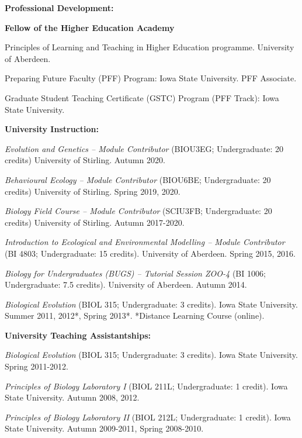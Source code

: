 \documentclass[letterpaper]{article}
\renewenvironment{itemize}{
  \begin{list}{}{
    \setlength{\leftmargin}{1.5em}
  }
}{
  \end{list}
}
\begin{document}
\begin{itemize}
\item {\bf Professional Development:}
\begin{itemize}
\item[$\bullet$]{{\bf Fellow of the Higher Education Academy}}
\item[$\bullet$]{Principles of Learning and Teaching in Higher Education programme. University of Aberdeen.}
\item[$\bullet$]{Preparing Future Faculty (PFF) Program: Iowa State University. PFF Associate.}
\item[$\bullet$]{Graduate Student Teaching Certificate (GSTC) Program (PFF Track): Iowa State University.}
\end{itemize}

\item {\bf University Instruction:}
\begin{itemize}
\item[$\bullet$]{{\it Evolution and Genetics -- Module Contributor} (BIOU3EG; Undergraduate: 20 credits) University of Stirling. Autumn 2020.}
\item[$\bullet$]{{\it Behavioural Ecology -- Module Contributor} (BIOU6BE; Undergraduate: 20 credits) University of Stirling. Spring 2019, 2020.}
\item[$\bullet$]{{\it Biology Field Course -- Module Contributor} (SCIU3FB; Undergraduate: 20 credits) University of Stirling. Autumn 2017-2020.}
\item[$\bullet$]{{\it Introduction to Ecological and Environmental Modelling -- Module Contributor} (BI 4803; Undergraduate: 15 credits). University of Aberdeen. Spring 2015, 2016.}
\item[$\bullet$]{{\it Biology for Undergraduates (BUGS) -- Tutorial Session ZOO-4} (BI 1006; Undergraduate: 7.5 credits). University of Aberdeen. Autumn 2014.}
\item[$\bullet$]{{\it Biological Evolution} (BIOL 315; Undergraduate: 3 credits). Iowa State University. Summer 2011, 2012*, Spring 2013*. *Distance Learning Course (online).}
\end{itemize}

\item {\bf University Teaching Assistantships:}
\begin{itemize}
\item[$\bullet$]{{\it Biological Evolution} (BIOL 315; Undergraduate: 3 credits). Iowa State University. Spring 2011-2012.}
\item[$\bullet$]{{\it Principles of Biology Laboratory I} (BIOL 211L; Undergraduate: 1 credit). Iowa State University. Autumn 2008, 2012.}
\item[$\bullet$]{{\it Principles of Biology Laboratory II} (BIOL 212L; Undergraduate: 1 credit). Iowa State University. Autumn 2009-2011, Spring 2008-2010.}
\end{itemize}


\end{itemize}
\end{document}
